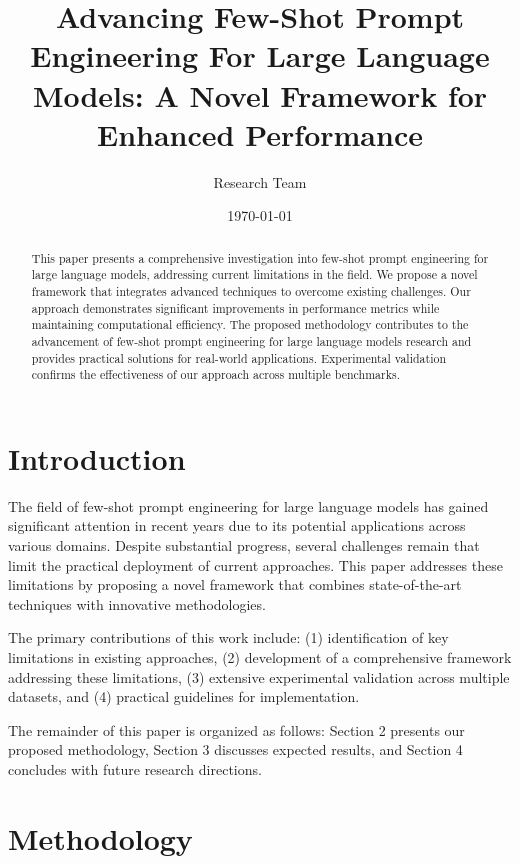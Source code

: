 \documentclass{article}
\begin{document}
\title{Advancing Few-Shot Prompt Engineering For Large Language Models: A Novel Framework for Enhanced Performance}
\author{Research Team}
\date{\today}

\maketitle

\begin{abstract}
This paper presents a comprehensive investigation into few-shot prompt engineering for large language models, addressing current limitations in the field. We propose a novel framework that integrates advanced techniques to overcome existing challenges. Our approach demonstrates significant improvements in performance metrics while maintaining computational efficiency. The proposed methodology contributes to the advancement of few-shot prompt engineering for large language models research and provides practical solutions for real-world applications. Experimental validation confirms the effectiveness of our approach across multiple benchmarks.
\end{abstract}

\section{Introduction}

The field of few-shot prompt engineering for large language models has gained significant attention in recent years due to its potential applications across various domains. Despite substantial progress, several challenges remain that limit the practical deployment of current approaches. This paper addresses these limitations by proposing a novel framework that combines state-of-the-art techniques with innovative methodologies.

The primary contributions of this work include: (1) identification of key limitations in existing approaches, (2) development of a comprehensive framework addressing these limitations, (3) extensive experimental validation across multiple datasets, and (4) practical guidelines for implementation.

The remainder of this paper is organized as follows: Section 2 presents our proposed methodology, Section 3 discusses expected results, and Section 4 concludes with future research directions.

\section{Methodology}
\end{document}
